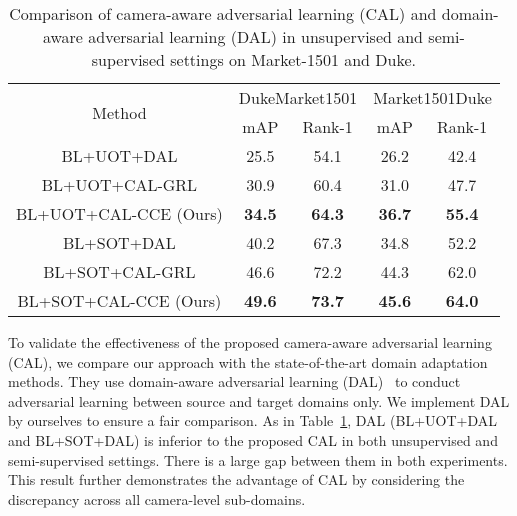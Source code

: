 \documentclass[10pt,twocolumn,letterpaper]{article}
\begin{document}
\begin{table}[htbp]
 \centering
 \caption{Comparison of camera-aware adversarial learning (CAL) and domain-aware adversarial learning (DAL) in unsupervised and semi-supervised settings on Market-1501 and Duke.}
 \begin{adjustbox}{width=0.48\textwidth}
   \begin{tabular}{|c|cc|cc|}
   \toprule
   \multirow{2}[2]{*}{Method} & \multicolumn{2}{c|}{DukeMarket1501} & \multicolumn{2}{c|}{Market1501Duke} \\
\cmidrule{2-5}         & mAP  & Rank-1 & mAP  & Rank-1 \\
   \midrule
   BL+UOT+DAL & 25.5 & 54.1 & 26.2 & 42.4 \\
   \midrule
   BL+UOT+CAL-GRL & 30.9 & 60.4 & 31.0 & 47.7 \\
   BL+UOT+CAL-CCE (Ours) & \textcolor[rgb]{ 1, 0, 0}{\textbf{34.5}} & \textcolor[rgb]{ 1, 0, 0}{\textbf{64.3}} & \textcolor[rgb]{ 1, 0, 0}{\textbf{36.7}} & \textcolor[rgb]{ 1, 0, 0}{\textbf{55.4}} \\
   \midrule
   \midrule
  BL+SOT+DAL & 40.2 & 67.3 & 34.8 & 52.2 \\
  \midrule
  BL+SOT+CAL-GRL & 46.6 & 72.2 & 44.3 & 62.0 \\
  BL+SOT+CAL-CCE (Ours) & \textcolor[rgb]{ 1, 0, 0}{\textbf{49.6}} & \textcolor[rgb]{ 1, 0, 0}{\textbf{73.7}} & \textcolor[rgb]{ 1, 0, 0}{\textbf{45.6}} & \textcolor[rgb]{ 1, 0, 0}{\textbf{64.0}} \\
   \bottomrule
   \end{tabular}\end{adjustbox}{}
 \label{tab03}\vspace*{-10pt}
\end{table}

To validate the effectiveness of the proposed camera-aware adversarial learning (CAL), we compare our approach with the state-of-the-art domain adaptation methods. They use domain-aware adversarial learning (DAL)~\cite{DBLP:conf/icml/GaninL15,DBLP:conf/cvpr/TzengHSD17} to conduct adversarial learning between source and target domains only. We implement DAL by ourselves to ensure a fair comparison. As in Table~\ref{tab03}, DAL (BL+UOT+DAL and BL+SOT+DAL) is inferior to the proposed CAL in both unsupervised and semi-supervised settings. There is a large gap between them in both experiments. This result further demonstrates the advantage of CAL by considering the discrepancy across all camera-level sub-domains.
 
 
 
\end{document}
